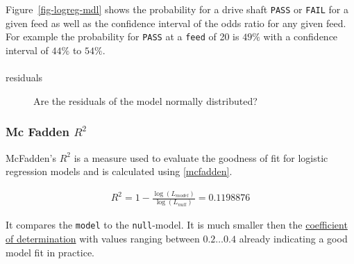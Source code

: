 \documentclass[
  a4paper,
]{scrbook}
\makeatletter
\let\oldparagraph\paragraph
\renewcommand{\paragraph}{
    \@ifstar
      \xxxParagraphStar
      \xxxParagraphNoStar
  }
\newcommand{\xxxParagraphStar}[1]{\oldparagraph*{#1}\mbox{}}
\newcommand{\xxxParagraphNoStar}[1]{\oldparagraph{#1}\mbox{}}
\makeatother
\begin{document}
Figure~\ref{fig-logreg-mdl} shows the probability for a drive shaft
\texttt{PASS} or \texttt{FAIL} for a given feed as well as the
confidence interval of the odds ratio for any given feed. For example
the probability for \texttt{PASS} at a \texttt{feed} of 20 is \(49 \%\)
with a confidence interval of \(44\%\) to \(54\%\).

\paragraph{residuals}\label{residuals-1}

\begin{figure}[H]


\caption{\label{fig-logreg-qq}Are the residuals of the model normally
distributed?}

\end{figure}%

\subsubsection{\texorpdfstring{Mc Fadden
\(R^2\)}{Mc Fadden R\^{}2}}\label{mc-fadden-r2}

McFadden's \(R^2\) is a measure used to evaluate the goodness of fit for
logistic regression models and is calculated using \eqref{mcfadden}.

\begin{align}
R^2 = 1- \frac{\log(L_{model})}{\log(L_{null})} \label{mcfadden} = 0.1198876
\end{align}

It compares the \texttt{model} to the \texttt{null}-model. It is much
smaller then the \hyperref[r2adj]{coefficient of determination} with
values ranging between \(0.2 \ldots 0.4\) already indicating a good
model fit in practice.
\end{document}
